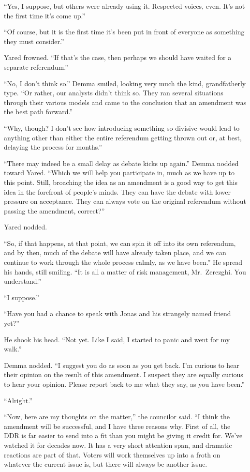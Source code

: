 ``Yes, I suppose, but others were already using it. Respected voices, even. It's not the first time it's come up.''

``Of course, but it is the first time it's been put in front of everyone as something they must consider.''

Yared frowned. ``If that's the case, then perhaps we should have waited for a separate referendum.''

``No, I don't think so.'' Demma smiled, looking very much the kind, grandfatherly type. ``Or rather, our analysts didn't think so. They ran several situations through their various models and came to the conclusion that an amendment was the best path forward.''

``Why, though? I don't see how introducing something so divisive would lead to anything other than either the entire referendum getting thrown out or, at best, delaying the process for months.''

``There may indeed be a small delay as debate kicks up again.'' Demma nodded toward Yared. ``Which we will help you participate in, much as we have up to this point. Still, broaching the idea as an amendment is a good way to get this idea in the forefront of people's minds. They can have the debate with lower pressure on acceptance. They can always vote on the original referendum without passing the amendment, correct?''

Yared nodded.

``So, if that happens, at that point, we can spin it off into its own referendum, and by then, much of the debate will have already taken place, and we can continue to work through the whole process calmly, as we have been.'' He spread his hands, still smiling. ``It is all a matter of risk management, Mr.~Zerezghi. You understand.''

``I suppose.''

``Have you had a chance to speak with Jonas and his strangely named friend yet?''

He shook his head. ``Not yet. Like I said, I started to panic and went for my walk.''

Demma nodded. ``I suggest you do as soon as you get back. I'm curious to hear their opinion on the result of this amendment. I suspect they are equally curious to hear your opinion. Please report back to me what they say, as you have been.''

``Alright.''

``Now, here are my thoughts on the matter,'' the councilor said. ``I think the amendment will be successful, and I have three reasons why. First of all, the DDR is far easier to send into a fit than you might be giving it credit for. We've watched it for decades now. It has a very short attention span, and dramatic reactions are part of that. Voters will work themselves up into a froth on whatever the current issue is, but there will always be another issue.

